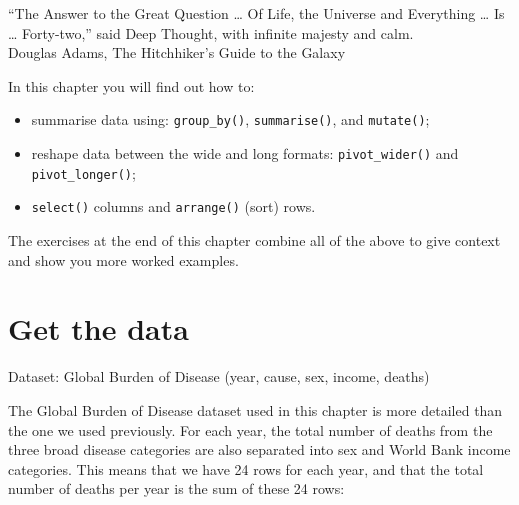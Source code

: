 \documentclass[
  12pt,
  krantz2]{krantz}
\makeatletter
\newenvironment{Shaded}{\begin{snugshade}}{\end{snugshade}}
\newcommand{\CommentTok}[1]{\textcolor[rgb]{0.56,0.35,0.01}{\textit{#1}}}
\newcommand{\DecValTok}[1]{\textcolor[rgb]{0.00,0.00,0.81}{#1}}
\newcommand{\KeywordTok}[1]{\textcolor[rgb]{0.13,0.29,0.53}{\textbf{#1}}}
\newcommand{\NormalTok}[1]{#1}
\newcommand{\OperatorTok}[1]{\textcolor[rgb]{0.81,0.36,0.00}{\textbf{#1}}}
\newcommand{\StringTok}[1]{\textcolor[rgb]{0.31,0.60,0.02}{#1}}
\providecommand{\tightlist}{%
  \setlength{\itemsep}{0pt}\setlength{\parskip}{0pt}}
\renewenvironment{quote}{\begin{VF}}{\end{VF}}
\newenvironment{kframe}{%
\medskip{}
\setlength{\fboxsep}{.8em}
 \def\at@end@of@kframe{}%
 \ifinner\ifhmode%
  \def\at@end@of@kframe{\end{minipage}}%
  \begin{minipage}{\columnwidth}%
 \fi\fi%
 \def\FrameCommand##1{\hskip\@totalleftmargin \hskip-\fboxsep
 \colorbox{shadecolor}{##1}\hskip-\fboxsep
     \hskip-\linewidth \hskip-\@totalleftmargin \hskip\columnwidth}%
 \MakeFramed {\advance\hsize-\width
   \@totalleftmargin\z@ \linewidth\hsize
   \@setminipage}}%
 {\par\unskip\endMakeFramed%
 \at@end@of@kframe}
\renewenvironment{Shaded}{\begin{kframe}}{\end{kframe}}
\makeatother
\begin{document}

\begin{quote}
``The Answer to the Great Question \ldots{} Of Life, the Universe and Everything \ldots{} Is \ldots{} Forty-two,'' said Deep Thought, with infinite majesty and calm.\\
Douglas Adams, The Hitchhiker's Guide to the Galaxy
\end{quote}

In this chapter you will find out how to:

\begin{itemize}
\tightlist
\item
  summarise data using: \texttt{group\_by()}, \texttt{summarise()}, and \texttt{mutate()};
\item
  reshape data between the wide and long formats: \texttt{pivot\_wider()} and \texttt{pivot\_longer()};
\item
  \texttt{select()} columns and \texttt{arrange()} (sort) rows.
\end{itemize}

The exercises at the end of this chapter combine all of the above to give context and show you more worked examples.

\hypertarget{get-the-data}{%
\section{Get the data}\label{get-the-data}}

Dataset: Global Burden of Disease (year, cause, sex, income, deaths)

The Global Burden of Disease dataset used in this chapter is more detailed than the one we used previously.
For each year, the total number of deaths from the three broad disease categories are also separated into sex and World Bank income categories.
This means that we have 24 rows for each year, and that the total number of deaths per year is the sum of these 24 rows:

\begin{Shaded}
\end{Shaded}
\end{document}
